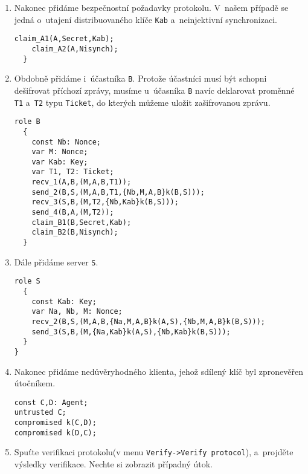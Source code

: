 \begin{enumerate}
  \item Nakonec přidáme bezpečnostní požadavky protokolu. V~našem případě se jedná o~utajení distribuovaného klíče \texttt{Kab}
  a~neinjektivní synchronizaci.
  \begin{lstlisting}[name=OtwayRees]
    claim_A1(A,Secret,Kab);
    claim_A2(A,Nisynch);
  }
  \end{lstlisting}

  \item Obdobně přidáme i~účastníka \texttt{B}. Protože účastníci musí být schopni
  dešifrovat příchozí zprávy, musíme u~účasníka \texttt{B} navíc
  deklarovat proměnné \texttt{T1} a~\texttt{T2} typu \texttt{Ticket}, do kterých
  můžeme uložit zašifrovanou zprávu.
  \begin{lstlisting}[name=OtwayRees]
  role B
  {
    const Nb: Nonce;
    var M: Nonce;
    var Kab: Key;
    var T1, T2: Ticket;
    recv_1(A,B,(M,A,B,T1));
    send_2(B,S,(M,A,B,T1,{Nb,M,A,B}k(B,S)));
    recv_3(S,B,(M,T2,{Nb,Kab}k(B,S)));
    send_4(B,A,(M,T2));
    claim_B1(B,Secret,Kab);
    claim_B2(B,Nisynch);
  }
  \end{lstlisting}

  \item Dále přidáme server \texttt{S}.
  \begin{lstlisting}[name=OtwayRees]
  role S
  {
    const Kab: Key;
    var Na, Nb, M: Nonce;
    recv_2(B,S,(M,A,B,{Na,M,A,B}k(A,S),{Nb,M,A,B}k(B,S)));
    send_3(S,B,(M,{Na,Kab}k(A,S),{Nb,Kab}k(B,S)));
  }
}
  \end{lstlisting}

  \item Nakonec přidáme nedůvěryhodného klienta, jehož sdílený klíč byl zpronevěřen útočníkem.
  \begin{lstlisting}[name=OtwayRees]
const C,D: Agent;
untrusted C;
compromised k(C,D);
compromised k(D,C);
  \end{lstlisting}

  \item Spuťte verifikaci protokolu(v menu \texttt{Verify->Verify protocol}), a~projděte výsledky verifikace. Nechte
  si zobrazit případný útok.
\end{enumerate}